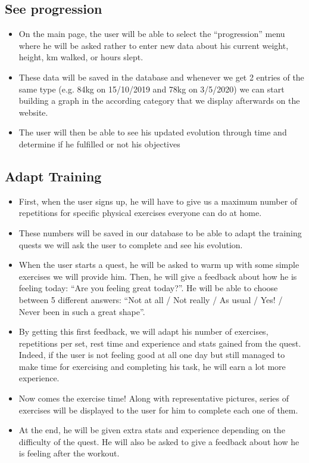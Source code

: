 \documentclass[conference]{IEEEtran}
\begin{document}
\subsection{See progression}
\begin{itemize}
\item On the main page, the user will be able to select the “progression” menu where he will be asked rather to enter new data about his current weight, height, km walked, or hours slept. 
\item These data will be saved in the database and whenever we get 2 entries of the same type (e.g. 84kg on 15/10/2019 and 78kg on 3/5/2020) we can start building a graph in the according category that we display afterwards on the website. 
\item The user will then be able to see his updated evolution through time and determine if he fulfilled or not his objectives
\end{itemize}

\subsection{Adapt Training}
\begin{itemize}
\item First, when the user signs up, he will have to give us a maximum number of repetitions for specific physical exercises everyone can do at home. 
\item These numbers will be saved in our database to be able to adapt the training quests we will ask the user to complete and see his evolution. 
\item When the user starts a quest, he will be asked to warm up with some simple exercises we will provide him. Then, he will give a feedback about how he is feeling today: “Are you feeling great today?”. He will be able to choose between 5 different answers: “Not at all / Not really / As usual / Yes! / Never been in such a great shape”. 
\item By getting this first feedback, we will adapt his number of exercises, repetitions per set, rest time and experience and stats gained from the quest. Indeed, if the user is not feeling good at all one day but still managed to make time for exercising and completing his task, he will earn a lot more experience.
\item Now comes the exercise time! Along with representative pictures, series of exercises will be displayed to the user for him to complete each one of them. 
\item At the end, he will be given extra stats and experience depending on the difficulty of the quest. He will also be asked to give a feedback about how he is feeling after the workout.
\end{itemize}
\end{document}
